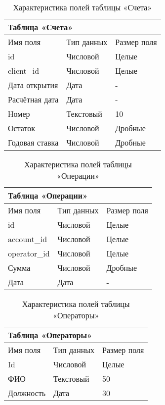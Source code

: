 \documentclass[14pt]{extarticle}
\begin{document}
    \begin{table}[!ht]
        \centering
        \begin{tabular}{|l|l|l|}
            \hline
            \multicolumn{3}{|l|}{Таблица «Счета»} \\
            \hline
            Имя поля & Тип данных & Размер поля \\
            \hline
            id & Числовой & Целые \\
            client\_id & Числовой & Целые \\
            Дата открытия & Дата & - \\
            Расчётная дата & Дата & - \\
            Номер & Текстовый & 10 \\
            Остаток & Числовой & Дробные \\
            Годовая ставка & Числовой & Дробные \\
            \hline
        \end{tabular}
        \caption{Характеристика полей таблицы «Счета»}
    \end{table}

    \begin{table}[!ht]
        \centering
        \begin{tabular}{|l|l|l|}
            \hline
            \multicolumn{3}{|l|}{Таблица «Операции»} \\
            \hline
            Имя поля & Тип данных & Размер поля \\
            \hline
            id & Числовой & Целые \\
            account\_id & Числовой & Целые \\
            operator\_id & Числовой & Целые \\
            Сумма & Числовой & Дробные \\
            Дата & Дата & - \\
            \hline
        \end{tabular}
        \caption{Характеристика полей таблицы «Операции»}
    \end{table}

    \newpage

    \begin{table}[!ht]
        \centering
        \begin{tabular}{|l|l|l|}
            \hline
            \multicolumn{3}{|l|}{Таблица «Операторы»} \\
            \hline
            Имя поля & Тип данных & Размер поля \\
            \hline
            Id & Числовой & Целые \\
            ФИО & Текстовый & 50 \\
            Должность & Дата & 30 \\
            \hline
        \end{tabular}
        \caption{Характеристика полей таблицы «Операторы»}
    \end{table}
\end{document}
